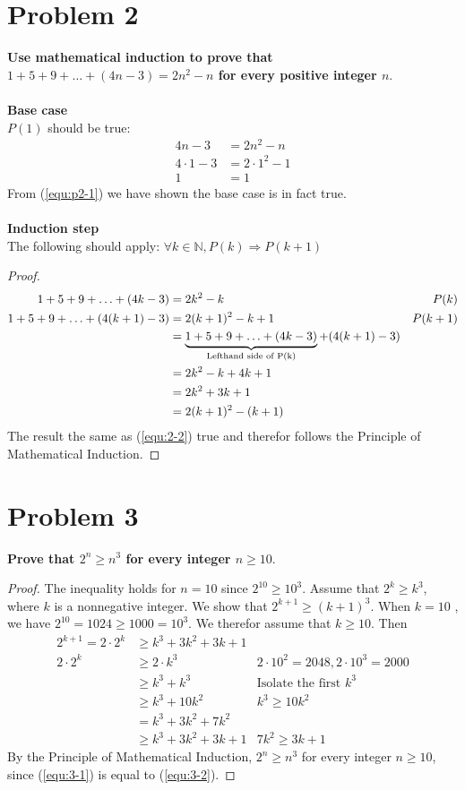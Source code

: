 \documentclass[english,11pt,a4paper]{article}
\begin{document}
\section*{Problem 2}
\textbf{Use mathematical induction to prove that $1+5+9+\ldots+(4n-3)=2n^2-n$ for every positive integer $n$}.
\\
\\
\textbf{Base case} 
\\
$P(1)$ should be true:
\begin{align}
4n-3 &= 2n^2-n \\
4\cdot 1-3 &= 2\cdot 1^2-1 \\
1 &= 1 \label{equ:p2-1}
\end{align}
From (\ref{equ:p2-1}) we have shown the base case is in fact true.
\\
\\
\textbf{Induction step}
\\
The following should apply: $\forall k \in \mathbb{N}, P(k) \Rightarrow P(k+1)$
\begin{proof}
\begin{align}
1+5+9+\ldots+(4k-3) &= 2k^2-k & P(k)\\
1+5+9+\ldots+(4(k+1)-3) &= 2(k+1)^2-k+1 & P(k+1) \label{equ:2-2}\\
	&= \underbrace{1+5+9+\ldots+(4k-3)}_{\mathclap{\text{Lefthand side of P(k)}}}+(4(k+1)-3)\\
	&=2k^2-k+4k+1\\
	&=2k^2+3k+1\\
	&=2(k+1)^2-(k+1) 
\end{align}
The result the same as (\ref{equ:2-2}) true and therefor follows the Principle of Mathematical Induction.\end{proof}



\section*{Problem 3}
\textbf{Prove that $2^n \geq n^3$ for every integer $n \geq 10$}.
\begin{proof}
The inequality holds for $n=10$ since $2^{10} \geq 10^3 $. 
Assume that $2^k \geq k^3$, where $k$ is a nonnegative integer. We show that $2^{k+1} \geq (k+1)^3$. When $k=10$ , we have $2^{10} = 1024 \geq 1000 = 10^3$. We therefor assume that $k \geq 10$. Then
\begin{align}
2^{k+1} = 2\cdot 2^k &\geq k^3+3k^2+3k+1 \label{equ:3-1}\\
2\cdot 2^k &\geq 2\cdot k^3 & 2\cdot 10^2= 2048, 2\cdot 10^3 = 2000\\
	&\geq k^3+k^3 & \text{Isolate the first } k^3\\
	&\geq k^3+ 10k^2 & k^3 \geq 10k^2\\
	&= k^3+ 3k^2+7k^2\\
	&\geq k^3+3k^2+3k+1 & 7k^2 \geq 3k+1 \label{equ:3-2}
\end{align}
By the Principle of Mathematical Induction, $2^n \geq n^3$ for every integer $n \geq 10$, since (\ref{equ:3-1}) is equal to (\ref{equ:3-2}).
\end{proof}
\end{document}
